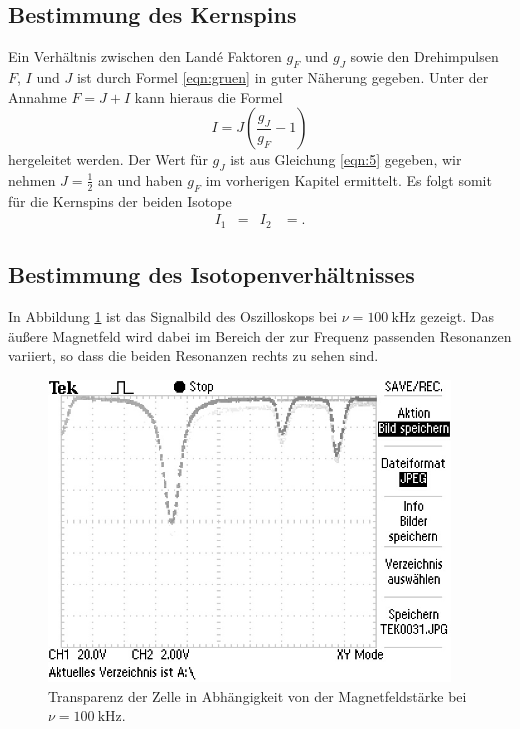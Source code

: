 \subsection{Bestimmung des Kernspins}
\label{sec:ks}
Ein Verhältnis zwischen den Land\'{e} Faktoren $g_F$ und $g_J$ sowie den Drehimpulsen $F$, $I$ und $J$ ist durch Formel \eqref{eqn:gruen} in guter Näherung gegeben.
Unter der Annahme $F = J+I$ kann hieraus die Formel
\begin{equation}
  I = J ( \frac{g_J}{g_F} - 1)
\end{equation}
hergeleitet werden.
Der Wert für $g_J$ ist aus Gleichung \eqref{eqn:5} gegeben, wir nehmen $J = \frac{1}{2}$ an und haben $g_F$ im vorherigen Kapitel ermittelt.
Es folgt somit für die Kernspins der beiden Isotope
\begin{align*}
  I_1 &=  & I_2 &= .
\end{align*}

\subsection{Bestimmung des Isotopenverhältnisses}

In Abbildung \ref{fig:typisch} ist das Signalbild des Oszilloskops bei $\nu = \SI{100}{\kilo\hertz}$ gezeigt.
Das äußere Magnetfeld wird dabei im Bereich der zur Frequenz passenden Resonanzen variiert, so dass die beiden Resonanzen rechts zu sehen sind.

\begin{figure}
  \centering
  \includegraphics[height=8cm]{ressources/TEK0031.png}
  \caption{Transparenz der Zelle in Abhängigkeit von der Magnetfeldstärke bei $\nu = \SI{100}{\kilo\hertz}$.}
  \label{fig:typisch}
\end{figure}

